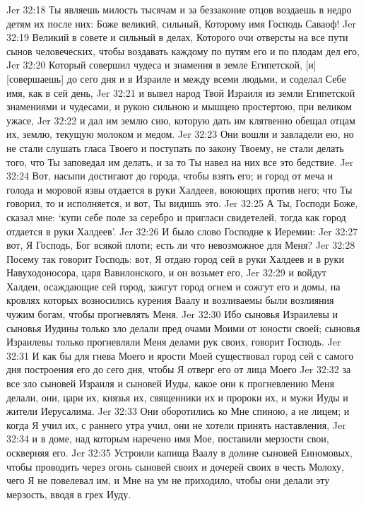 Jer 32:18  Ты являешь милость тысячам и за беззаконие отцов воздаешь в недро детям их после них: Боже великий, сильный, Которому имя Господь Саваоф!
Jer 32:19  Великий в совете и сильный в делах, Которого очи отверсты на все пути сынов человеческих, чтобы воздавать каждому по путям его и по плодам дел его,
Jer 32:20  Который совершил чудеса и знамения в земле Египетской, [и] [совершаешь] до сего дня и в Израиле и между всеми людьми, и соделал Себе имя, как в сей день,
Jer 32:21  и вывел народ Твой Израиля из земли Египетской знамениями и чудесами, и рукою сильною и мышцею простертою, при великом ужасе,
Jer 32:22  и дал им землю сию, которую дать им клятвенно обещал отцам их, землю, текущую молоком и медом.
Jer 32:23  Они вошли и завладели ею, но не стали слушать гласа Твоего и поступать по закону Твоему, не стали делать того, что Ты заповедал им делать, и за то Ты навел на них все это бедствие.
Jer 32:24  Вот, насыпи достигают до города, чтобы взять его; и город от меча и голода и моровой язвы отдается в руки Халдеев, воюющих против него; что Ты говорил, то и исполняется, и вот, Ты видишь это.
Jer 32:25  А Ты, Господи Боже, сказал мне: `купи себе поле за серебро и пригласи свидетелей, тогда как город отдается в руки Халдеев'.
Jer 32:26  И было слово Господне к Иеремии:
Jer 32:27  вот, Я Господь, Бог всякой плоти; есть ли что невозможное для Меня?
Jer 32:28  Посему так говорит Господь: вот, Я отдаю город сей в руки Халдеев и в руки Навуходоносора, царя Вавилонского, и он возьмет его,
Jer 32:29  и войдут Халдеи, осаждающие сей город, зажгут город огнем и сожгут его и домы, на кровлях которых возносились курения Ваалу и возливаемы были возлияния чужим богам, чтобы прогневлять Меня.
Jer 32:30  Ибо сыновья Израилевы и сыновья Иудины только зло делали пред очами Моими от юности своей; сыновья Израилевы только прогневляли Меня делами рук своих, говорит Господь.
Jer 32:31  И как бы для гнева Моего и ярости Моей существовал город сей с самого дня построения его до сего дня, чтобы Я отверг его от лица Моего
Jer 32:32  за все зло сыновей Израиля и сыновей Иуды, какое они к прогневлению Меня делали, они, цари их, князья их, священники их и пророки их, и мужи Иуды и жители Иерусалима.
Jer 32:33  Они оборотились ко Мне спиною, а не лицем; и когда Я учил их, с раннего утра учил, они не хотели принять наставления,
Jer 32:34  и в доме, над которым наречено имя Мое, поставили мерзости свои, оскверняя его.
Jer 32:35  Устроили капища Ваалу в долине сыновей Енномовых, чтобы проводить через огонь сыновей своих и дочерей своих в честь Молоху, чего Я не повелевал им, и Мне на ум не приходило, чтобы они делали эту мерзость, вводя в грех Иуду.
